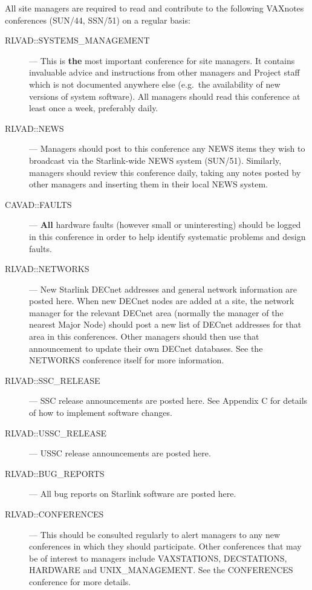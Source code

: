 All site managers are required to read and contribute to the following 
VAXnotes conferences (SUN/44, SSN/51) on a regular basis:
\begin{description}
\begin{description}

\item [RLVAD::SYSTEMS\_MANAGEMENT] ---
This is {\bf the} most important conference for site managers.
It contains invaluable advice and instructions from other managers and Project
staff which is not documented anywhere else (e.g.\ the availability of new
versions of system software).
All managers should read this conference at least once a week, preferably daily.

\item [RLVAD::NEWS] ---
Managers should post to this conference any NEWS items they wish to broadcast
via the Starlink-wide NEWS system (SUN/51).
Similarly, managers should review this conference daily, taking any notes
posted by other managers and inserting them in their local NEWS system.

\item [CAVAD::FAULTS] ---
{\bf All} hardware faults (however small or uninteresting) should be logged in
this conference in order to help identify systematic problems and design faults.

\item [RLVAD::NETWORKS] ---
New Starlink DECnet addresses and general network information are posted here.
When new DECnet nodes are added at a site, the network manager for the relevant 
DECnet area (normally the manager of the nearest Major Node) should post a new
list of DECnet addresses for that area in this conferences.
Other managers should then use that announcement to update their own DECnet
databases.
See the NETWORKS conference itself for more information.
 
\item [RLVAD::SSC\_RELEASE] ---
SSC release announcements are posted here.
See Appendix C for details of how to implement software changes.

\item [RLVAD::USSC\_RELEASE] ---
USSC release announcements are posted here.

\item [RLVAD::BUG\_REPORTS] ---
All bug reports on Starlink software are posted here.

\item [RLVAD::CONFERENCES] ---
This should be consulted regularly to alert managers to any new conferences
in which they should participate.
Other conferences that may be of interest to managers include VAXSTATIONS,
DECSTATIONS, HARDWARE and UNIX\_MANAGEMENT.
See the CONFERENCES conference for more details.

\end{description}
\end{description}

